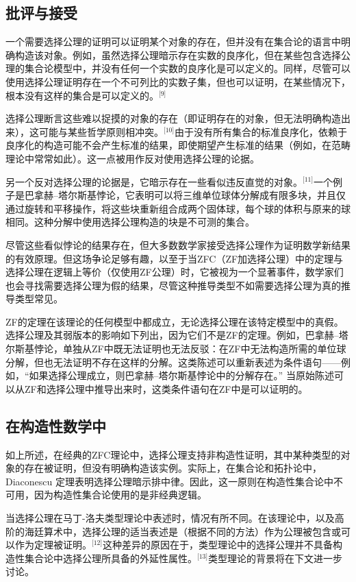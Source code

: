 \subsection{批评与接受}  
一个需要选择公理的证明可以证明某个对象的存在，但并没有在集合论的语言中明确构造该对象。例如，虽然选择公理暗示存在实数的良序化，但在某些包含选择公理的集合论模型中，并没有任何一个实数的良序化是可以定义的。同样，尽管可以使用选择公理证明存在一个不可列比的实数子集，但也可以证明，在某些情况下，根本没有这样的集合是可以定义的。\(^\text{[9]}\)

选择公理断言这些难以捉摸的对象的存在（即证明存在的对象，但无法明确构造出来），这可能与某些哲学原则相冲突。\(^\text{[10]}\)由于没有所有集合的标准良序化，依赖于良序化的构造可能不会产生标准的结果，即使期望产生标准的结果（例如，在范畴理论中常常如此）。这一点被用作反对使用选择公理的论据。

另一个反对选择公理的论据是，它暗示存在一些看似违反直觉的对象。\(^\text{[11]}\)一个例子是巴拿赫–塔尔斯基悖论，它表明可以将三维单位球体分解成有限多块，并且仅通过旋转和平移操作，将这些块重新组合成两个固体球，每个球的体积与原来的球相同。这种分解中使用选择公理构造的块是不可测的集合。

尽管这些看似悖论的结果存在，但大多数数学家接受选择公理作为证明数学新结果的有效原理。但这场争论足够有趣，以至于当ZFC（ZF加选择公理）中的定理与选择公理在逻辑上等价（仅使用ZF公理）时，它被视为一个显著事件，数学家们也会寻找需要选择公理为假的结果，尽管这种推导类型不如需要选择公理为真的推导类型常见。

ZF的定理在该理论的任何模型中都成立，无论选择公理在该特定模型中的真假。选择公理及其弱版本的影响如下列出，因为它们不是ZF的定理。例如，巴拿赫–塔尔斯基悖论，单独从ZF中既无法证明也无法反驳：在ZF中无法构造所需的单位球分解，但也无法证明不存在这样的分解。这类陈述可以重新表述为条件语句——例如，“如果选择公理成立，则巴拿赫–塔尔斯基悖论中的分解存在。” 当原始陈述可以从ZF和选择公理中推导出来时，这类条件语句在ZF中是可以证明的。
\subsection{在构造性数学中}  
如上所述，在经典的ZFC理论中，选择公理支持非构造性证明，其中某种类型的对象的存在被证明，但没有明确构造该实例。实际上，在集合论和拓扑论中，Diaconescu 定理表明选择公理暗示排中律。因此，这一原则在构造性集合论中不可用，因为构造性集合论使用的是非经典逻辑。

当选择公理在马丁-洛夫类型理论中表述时，情况有所不同。在该理论中，以及高阶的海廷算术中，选择公理的适当表述是（根据不同的方法）作为公理被包含或可以作为定理被证明。\(^\text{[12]}\)这种差异的原因在于，类型理论中的选择公理并不具备构造性集合论中选择公理所具备的外延性属性。\(^\text{[13]}\)类型理论的背景将在下文进一步讨论。

